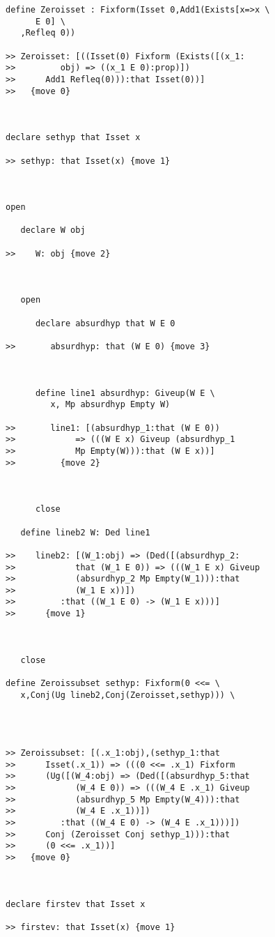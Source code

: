 \documentclass[12pt]{article}
\begin{document}
\begin{verbatim}
define Zeroisset : Fixform(Isset 0,Add1(Exists[x=>x \
      E 0] \
   ,Refleq 0))

>> Zeroisset: [((Isset(0) Fixform (Exists([(x_1:
>>         obj) => ((x_1 E 0):prop)])
>>      Add1 Refleq(0))):that Isset(0))]
>>   {move 0}



declare sethyp that Isset x

>> sethyp: that Isset(x) {move 1}



open

   declare W obj

>>    W: obj {move 2}



   open

      declare absurdhyp that W E 0

>>       absurdhyp: that (W E 0) {move 3}



      define line1 absurdhyp: Giveup(W E \
         x, Mp absurdhyp Empty W)

>>       line1: [(absurdhyp_1:that (W E 0))
>>            => (((W E x) Giveup (absurdhyp_1
>>            Mp Empty(W))):that (W E x))]
>>         {move 2}



      close

   define lineb2 W: Ded line1

>>    lineb2: [(W_1:obj) => (Ded([(absurdhyp_2:
>>            that (W_1 E 0)) => (((W_1 E x) Giveup
>>            (absurdhyp_2 Mp Empty(W_1))):that
>>            (W_1 E x))])
>>         :that ((W_1 E 0) -> (W_1 E x)))]
>>      {move 1}



   close

define Zeroissubset sethyp: Fixform(0 <<= \
   x,Conj(Ug lineb2,Conj(Zeroisset,sethyp))) \
   



>> Zeroissubset: [(.x_1:obj),(sethyp_1:that
>>      Isset(.x_1)) => (((0 <<= .x_1) Fixform
>>      (Ug([(W_4:obj) => (Ded([(absurdhyp_5:that
>>            (W_4 E 0)) => (((W_4 E .x_1) Giveup
>>            (absurdhyp_5 Mp Empty(W_4))):that
>>            (W_4 E .x_1))])
>>         :that ((W_4 E 0) -> (W_4 E .x_1)))])
>>      Conj (Zeroisset Conj sethyp_1))):that
>>      (0 <<= .x_1))]
>>   {move 0}



declare firstev that Isset x

>> firstev: that Isset(x) {move 1}




\end{verbatim}
\end{document}
